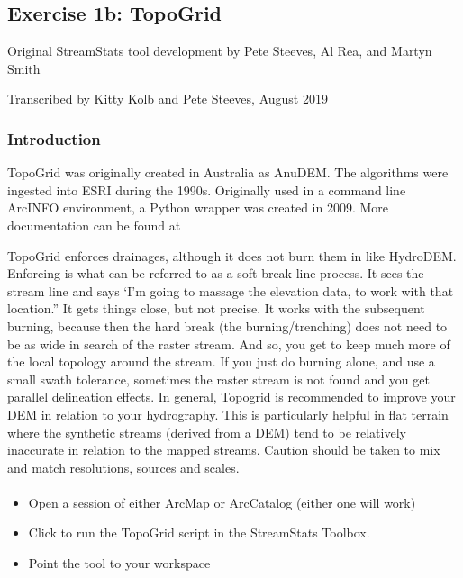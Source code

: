 \documentclass[letterpaper,10pt,english]{sphinxmanual}
\begin{document}
\subsection{Exercise 1b: TopoGrid}
\label{\detokenize{ex_1b:exercise-1b-topogrid}}\label{\detokenize{ex_1b::doc}}
Original StreamStats tool development by Pete Steeves, Al Rea, and Martyn Smith

Transcribed by Kitty Kolb and Pete Steeves, August 2019


\subsubsection{Introduction}
\label{\detokenize{ex_1b:introduction}}
TopoGrid was originally created in Australia as AnuDEM. The algorithms were ingested into ESRI during the 1990s. Originally used in a command line ArcINFO environment, a Python wrapper was created in 2009. More documentation can be found at 

TopoGrid enforces drainages, although it does not burn them in like HydroDEM. Enforcing is what can be referred to as a soft break-line process. It sees the stream line and says ‘I’m going to massage the elevation data, to work with that location.” It gets things close, but not precise. It works with the subsequent burning, because then the hard break (the burning/trenching) does not need to be as wide in search of the raster stream. And so, you get to keep much more of the local topology around the stream. If you just do burning alone, and use a small swath tolerance, sometimes the raster stream is not found and you get parallel delineation effects. In general, Topogrid is recommended to improve your DEM in relation to your hydrography. This is particularly helpful in flat terrain where the synthetic streams (derived from a DEM) tend to be relatively inaccurate in relation to the mapped streams.  Caution should be taken to mix and match resolutions, sources and scales.


\paragraph{}
\label{\detokenize{ex_1b:setup}}\begin{itemize}
\item {} 
Open a session of either ArcMap or ArcCatalog (either one will work)

\item {} 
Click to run the TopoGrid script in the StreamStats Toolbox.

\item {} 
Point the tool to your workspace

\end{itemize}
\end{document}
